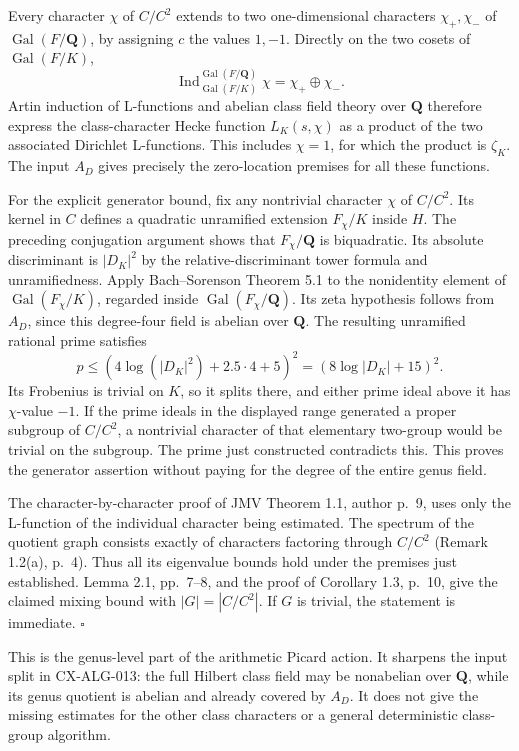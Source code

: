 \documentclass[11pt,a4paper]{article}
\begin{document}
Every character $\chi$ of $C/C^2$ extends to two one-dimensional
characters $\chi_+,\chi_-$ of $\operatorname{Gal}(F/\mathbf Q)$, by
assigning $c$ the values $1,-1$. Directly on the two cosets of
$\operatorname{Gal}(F/K)$,
\[
       \operatorname{Ind}_{\operatorname{Gal}(F/K)}^{
                       \operatorname{Gal}(F/\mathbf Q)}\chi
                         =\chi_+\oplus\chi_-.
\]
Artin induction of L-functions and abelian class field theory over
$\mathbf Q$ therefore express the class-character Hecke function
$L_K(s,\chi)$ as a product of the two associated Dirichlet L-functions.
This includes $\chi=1$, for which the product is $\zeta_K$.
The input $A_D$ gives precisely the zero-location premises for all these
functions.

For the explicit generator bound, fix any nontrivial character $\chi$ of
$C/C^2$. Its kernel in $C$ defines a quadratic unramified extension
$F_\chi/K$ inside $H$. The preceding conjugation argument shows that
$F_\chi/\mathbf Q$ is biquadratic. Its absolute discriminant is
$|D_K|^2$ by the relative-discriminant tower formula and unramifiedness.
Apply Bach--Sorenson Theorem 5.1 to the nonidentity element of
$\operatorname{Gal}(F_\chi/K)$, regarded inside
$\operatorname{Gal}(F_\chi/\mathbf Q)$. Its zeta hypothesis follows from
$A_D$, since this degree-four field is abelian over $\mathbf Q$.
The resulting unramified rational prime satisfies
\[
            p\le(4\log(|D_K|^2)+2.5\cdot4+5)^2
                    =(8\log|D_K|+15)^2.
\]
Its Frobenius is trivial on $K$, so it splits there, and either prime
ideal above it has $\chi$-value $-1$. If the prime ideals in the displayed
range generated a proper subgroup of $C/C^2$, a nontrivial character of
that elementary two-group would be trivial on the subgroup. The prime just
constructed contradicts this. This proves the generator assertion without
paying for the degree of the entire genus field.

The character-by-character proof of JMV Theorem 1.1, author p.~9,
uses only the L-function of the individual character being estimated.
The spectrum of the quotient graph consists exactly of characters
factoring through $C/C^2$ (Remark 1.2(a), p.~4). Thus all its eigenvalue
bounds hold under the premises just established. Lemma 2.1, pp.~7--8,
and the proof of Corollary 1.3, p.~10, give the claimed mixing bound
with $|G|=|C/C^2|$. If $G$ is trivial, the statement is immediate.
\hfill$\square$

This is the genus-level part of the arithmetic Picard action. It sharpens
the input split in CX-ALG-013: the full Hilbert class field may be
nonabelian over $\mathbf Q$, while its genus quotient is abelian and
already covered by $A_D$. It does not give the missing estimates for the
other class characters or a general deterministic class-group algorithm.
\end{document}
